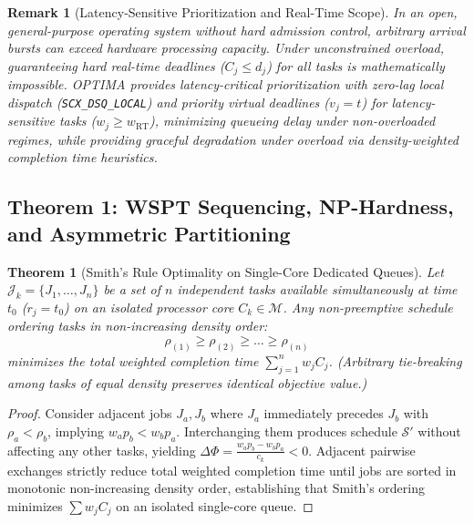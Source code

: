 \documentclass[conference]{IEEEtran}
\newtheorem{theorem}{Theorem}
\newtheorem{remark}{Remark}
\begin{document}
\begin{remark}[Latency-Sensitive Prioritization and Real-Time Scope]
\label{rem:realtime_softening}
In an open, general-purpose operating system without hard admission control, arbitrary arrival bursts can exceed hardware processing capacity. Under unconstrained overload, guaranteeing hard real-time deadlines ($C_j \le d_j$) for all tasks is mathematically impossible. OPTIMA provides latency-critical prioritization with zero-lag local dispatch (\texttt{SCX\_DSQ\_LOCAL}) and priority virtual deadlines ($v_j = t$) for latency-sensitive tasks ($w_j \ge w_{\mathrm{RT}}$), minimizing queueing delay under non-overloaded regimes, while providing graceful degradation under overload via density-weighted completion time heuristics.
\end{remark}

\subsection{Theorem 1: WSPT Sequencing, NP-Hardness, and Asymmetric Partitioning}

\begin{theorem}[Smith's Rule Optimality on Single-Core Dedicated Queues]
\label{thm:wspt}
Let $\mathcal{J}_k = \{J_1, \dots, J_n\}$ be a set of $n$ independent tasks available simultaneously at time $t_0$ ($r_j = t_0$) on an isolated processor core $C_k \in \mathcal{M}$. Any non-preemptive schedule ordering tasks in non-increasing density order:
\begin{equation}
\rho_{(1)} \ge \rho_{(2)} \ge \dots \ge \rho_{(n)}
\end{equation}
minimizes the total weighted completion time $\sum_{j=1}^n w_j C_j$. (Arbitrary tie-breaking among tasks of equal density preserves identical objective value.)
\end{theorem}

\begin{proof}
Consider adjacent jobs $J_a, J_b$ where $J_a$ immediately precedes $J_b$ with $\rho_a < \rho_b$, implying $w_a p_b < w_b p_a$. Interchanging them produces schedule $\mathcal{S}'$ without affecting any other tasks, yielding $\Delta \Phi = \frac{w_a p_b - w_b p_a}{c_k} < 0$. Adjacent pairwise exchanges strictly reduce total weighted completion time until jobs are sorted in monotonic non-increasing density order, establishing that Smith's ordering minimizes $\sum w_j C_j$ on an isolated single-core queue.
\end{proof}
\end{document}
